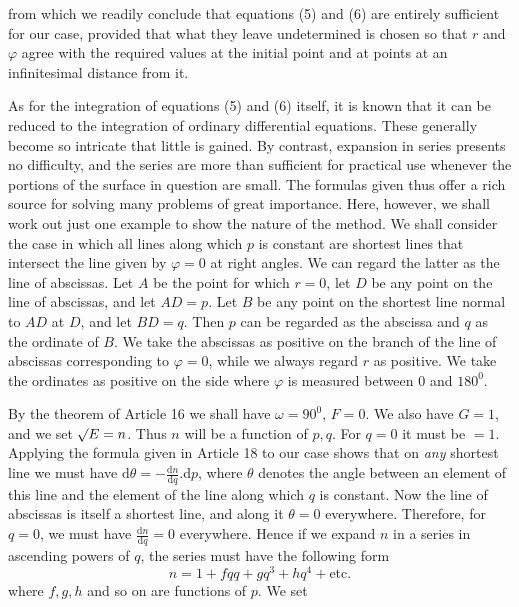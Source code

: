%
from which we readily conclude that equations (5) and (6) are entirely sufficient for our case, provided that what they leave undetermined is chosen so that \(r\) and \(\varphi\) agree with the required values at the initial point and at points at an infinitesimal distance from it.

As for the integration of equations (5) and (6) itself, it is known that it can be reduced to the integration of ordinary differential equations. These generally become so intricate that little is gained. By contrast, expansion in series presents no difficulty, and the series are more than sufficient for practical use whenever the portions of the surface in question are small. The formulas given thus offer a rich source for solving many problems of great importance. Here, however, we shall work out just one example to show the nature of the method.
We shall consider the case in which all lines along which \(p\) is constant are shortest lines that intersect the line given by \(\varphi=0\) at right angles. We can regard the latter as the line of abscissas. Let \(A\) be the point for which \(r=0\), let \(D\) be any point on the line of abscissas, and let \(AD=p\). Let \(B\) be any point on the shortest line normal to \(AD\) at \(D\), and let \(BD=q\). Then \(p\) can be regarded as the abscissa and \(q\) as the ordinate of \(B\). We take the abscissas as positive on the branch of the line of abscissas corresponding to \(\varphi=0\), while we always regard \(r\) as positive. We take the ordinates as positive on the side where \(\varphi\) is measured between 0 and \(180^0\).

By the theorem of Article 16 we shall have \(\omega=90^0\), \(F=0\). We also have \(G=1\), and we set \(\mathord{{}^{}\!\surd}E=n\). Thus \(n\) will be a function of \(p,q\). For \(q=0\) it must be \(=1\). Applying the formula given in Article 18 to our case shows that on \textit{any} shortest line we must have \(\mathrm{d}\theta=-\frac{\mathrm{d}n}{\mathrm{d}q}\mathord{.}\mathrm{d}p\), where \(\theta\) denotes the angle between an element of this line and the element of the line along which \(q\) is constant. Now the line of abscissas is itself a shortest line, and along it \(\theta=0\) everywhere. Therefore, for \(q=0\), we must have \(\frac{\mathrm{d}n}{\mathrm{d}q}=0\) everywhere. Hence if we expand \(n\) in a series in ascending powers of \(q\), the series must have the following form
\[
n=1+fqq+gq^3+hq^4+\text{etc.}
\]
where \(f,g,h\) and so on are functions of \(p\). We set
